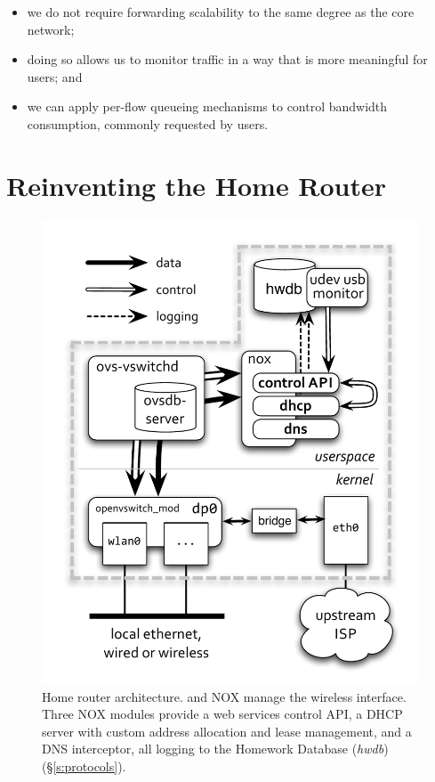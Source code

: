 \begin{itemize}
    \item we do not require forwarding scalability to the same degree as the
          core network; 
    \item doing so allows us to monitor traffic in a way that is more meaningful
          for users; and 
    \item we can apply per-flow queueing mechanisms to control bandwidth
          consumption, commonly requested by users.  
  \end{itemize}


\section{Reinventing the Home Router} \label{s:router}
 
\begin{figure} 
  \centering 
  \includegraphics[trim=0.5cm 1cm 0.5cm 2.5cm, width=0.5\columnwidth]{architecture}
  \caption[Home router architecture]{\label{f:architecture}Home router architecture.  \ovs
    and NOX manage the wireless interface.  Three NOX modules
    provide a web services control API, a DHCP server with custom address
    allocation and lease management, and a DNS interceptor, all logging to the
    Homework Database (\emph{hwdb}) (\S\ref{s:protocols}). 
}\end{figure}

